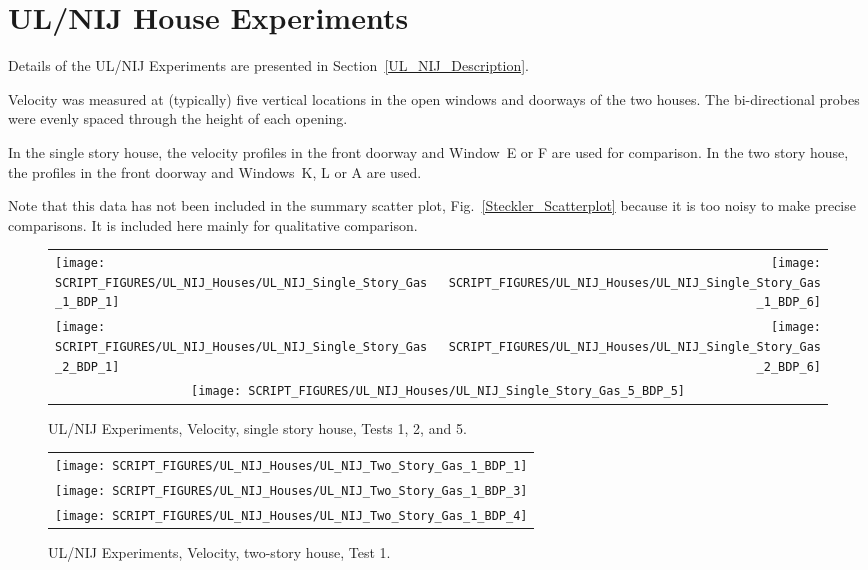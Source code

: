 \section{UL/NIJ House Experiments}

Details of the UL/NIJ Experiments are presented in Section~\ref{UL_NIJ_Description}.

Velocity was measured at (typically) five vertical locations in the open windows and doorways of the two houses. The bi-directional probes were evenly spaced through the height of each opening.

In the single story house, the velocity profiles in the front doorway and Window~E or F are used for comparison. In the two story house, the profiles in the front doorway and Windows~K, L or A are used.

Note that this data has not been included in the summary scatter plot, Fig.~\ref{Steckler_Scatterplot} because it is too noisy to make precise comparisons. It is included here mainly for qualitative comparison.

\begin{figure}[p]
\begin{tabular*}{\textwidth}{l@{\extracolsep{\fill}}r}
\texttt{[image: SCRIPT\_FIGURES/UL\_NIJ\_Houses/UL\_NIJ\_Single\_Story\_Gas\_1\_BDP\_1]} &
\texttt{[image: SCRIPT\_FIGURES/UL\_NIJ\_Houses/UL\_NIJ\_Single\_Story\_Gas\_1\_BDP\_6]} \\
\texttt{[image: SCRIPT\_FIGURES/UL\_NIJ\_Houses/UL\_NIJ\_Single\_Story\_Gas\_2\_BDP\_1]} &
\texttt{[image: SCRIPT\_FIGURES/UL\_NIJ\_Houses/UL\_NIJ\_Single\_Story\_Gas\_2\_BDP\_6]} \\
\multicolumn{2}{c}{\texttt{[image: SCRIPT\_FIGURES/UL\_NIJ\_Houses/UL\_NIJ\_Single\_Story\_Gas\_5\_BDP\_5]}}
\end{tabular*}
\caption[UL/NIJ Experiments, Velocity, single story house, Tests 1, 2, and 5]{UL/NIJ Experiments, Velocity, single story house, Tests 1, 2, and 5.}
\label{UL_NIJ_Vel_Ranch_123}
\end{figure}

\begin{figure}[p]
\begin{center}
\begin{tabular}{c}
\texttt{[image: SCRIPT\_FIGURES/UL\_NIJ\_Houses/UL\_NIJ\_Two\_Story\_Gas\_1\_BDP\_1]} \\
\texttt{[image: SCRIPT\_FIGURES/UL\_NIJ\_Houses/UL\_NIJ\_Two\_Story\_Gas\_1\_BDP\_3]} \\
\texttt{[image: SCRIPT\_FIGURES/UL\_NIJ\_Houses/UL\_NIJ\_Two\_Story\_Gas\_1\_BDP\_4]}
\end{tabular}
\end{center}
\caption[UL/NIJ Experiments, Velocity, two-story house, Test 1]{UL/NIJ Experiments, Velocity, two-story house, Test 1.}
\label{UL_NIJ_Vel_Colonial_1}
\end{figure}

